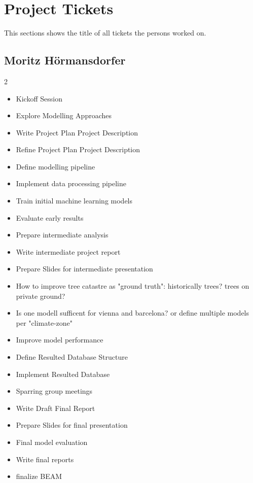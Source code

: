 \section{Project Tickets}

This sections shows the title of all tickets the persons worked on.

\subsection*{Moritz Hörmansdorfer}
{\footnotesize
\begin{multicols}{2}
\begin{itemize}[leftmargin=*, nosep]
    \item Kickoff Session
    \item Explore Modelling Approaches
    \item Write Project Plan Project Description
    \item Refine Project Plan Project Description
    \item Define modelling pipeline
    \item Implement data processing pipeline
    \item Train initial machine learning models
    \item Evaluate early results
    \item Prepare intermediate analysis
    \item Write intermediate project report
    \item Prepare Slides for intermediate presentation
    \item How to improve tree catastre as "ground truth": historically trees? trees on private ground?
    \item Is one modell sufficent for vienna and barcelona? or define multiple models per "climate-zone"
    \item Improve model performance
    \item Define Resulted Database Structure
    \item Implement Resulted Database
    \item Sparring group meetings
    \item Write Draft Final Report
    \item Prepare Slides for final presentation
    \item Final model evaluation
    \item Write final reports
    \item finalize BEAM
\end{itemize}
\end{multicols}
}

